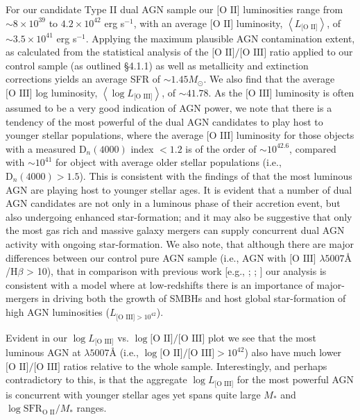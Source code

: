 For our candidate Type II dual AGN sample our $\text{[O II]}$ luminosities range from $\sim{8\times{10}^{39}}$ to $4.2\times{10}^{42}$ erg s$^{-1}$, with an average $\text{[O II]}$ luminosity, $\left\langle{L_{\text{[O II]}}}\right\rangle$, of $\sim{3.5\times{10^{41}}}$ erg s$^{-1}$. Applying the maximum plausible AGN contamination extent, as calculated from the statistical analysis of the $\text{[O II]}/\text{[O III]}$ ratio applied to our control sample (as outlined §4.1.1) as well as metallicity and extinction corrections yields an average SFR of $\sim{1.45}M_{\odot}$. We also find that the average $\text{[O III]}$ log  luminosity, $\left\langle\log{L_{\text{[O III]}}}\right\rangle$, of $\sim{41.78}$. As the $\text{[O III]}$ luminosity is often assumed to be a very good indication of AGN power, we note that there is a tendency of the most powerful of the dual AGN candidates to play host to younger stellar populations, where the average $\text{[O III]}$ luminosity for those objects with a measured $\text{D}_n(4000)$ index $<{1.2}$ is of the order of $\sim{10^{42.6}}$, compared with $\sim{10^{41}}$ for object with average older stellar populations (i.e., $\text{D}_n(4000)>{1.5}$). This is consistent with the findings of \cite{Kauffmann_2003} that the most luminous AGN are playing host to younger stellar ages. It is evident that a number of dual AGN candidates are not only in a luminous phase of their accretion event, but also undergoing enhanced star-formation; and it may also be suggestive that only the most gas rich and massive galaxy mergers can supply concurrent dual AGN activity with ongoing star-formation. We also note, that although there are major differences between our control pure AGN sample (i.e., AGN with $\text{[O III]}$ $\lambda{5007}Å$/$\text{H}\beta$ > 10), that in comparison with previous work [e.g., \cite{Volonteri_2003}; \cite{Gu_2006}; \cite{Somerville_2008} \cite{Rosario_2012}] our analysis is consistent with a model where at low-redshifts there is an importance of major-mergers in driving both the growth of SMBHs and host global star-formation of high AGN luminosities ($L_{\text{[O III]}>{10^{42}}}$). 

Evident in our $\log{L_{\text{[O III]}}}$ vs. $\log{\text{[O II]}/\text{[O III]}}$ plot we see that the most luminous AGN at $\lambda5007Å$ (i.e., $\log{\text{[O II]}/\text{[O III]}}>{10^{42}}$) also have much lower $\text{[O II]}/\text{[O III]}$ ratios relative to the whole sample. Interestingly, and perhaps contradictory to this, is that the aggregate $\log{L_{\text{[O III]}}}$ for the most powerful AGN is concurrent with younger stellar ages yet spans quite large $M_{*}$ and $\log{\text{SFR}_{\text{O II}}/M_{*}}$ ranges.
 
